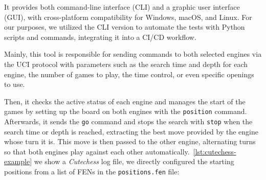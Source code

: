 \vspace{1em}

\noindent It provides both command-line interface (CLI) and a graphic user interface (GUI), with cross-platform compatibility for Windows, macOS, and Linux. For our purposes, we utilized the CLI version to automate the tests with Python scripts and commands, integrating it into a CI/CD workflow.

\vspace{1em}

\noindent Mainly, this tool is responsible for sending commands to both selected engines via the UCI protocol with parameters such as the search time and depth for each engine, the number of games to play, the time control, or even specific openings to use.

\vspace{1em}

\noindent Then, it checks the active status of each engine and manages the start of the games by setting up the board on both engines with the \texttt{position} command. Afterwards, it sends the \texttt{go} command and stops the search with \texttt{stop} when the search time or depth is reached, extracting the best move provided by the engine whose turn it is. This move is then passed to the other engine, alternating turns so that both engines play against each other automatically.~\cref{lst:cutechess-example} we show a \textit{Cutechess} log file, we directly configured the starting positions from a list of FENs in the \texttt{positions.fen} file:

